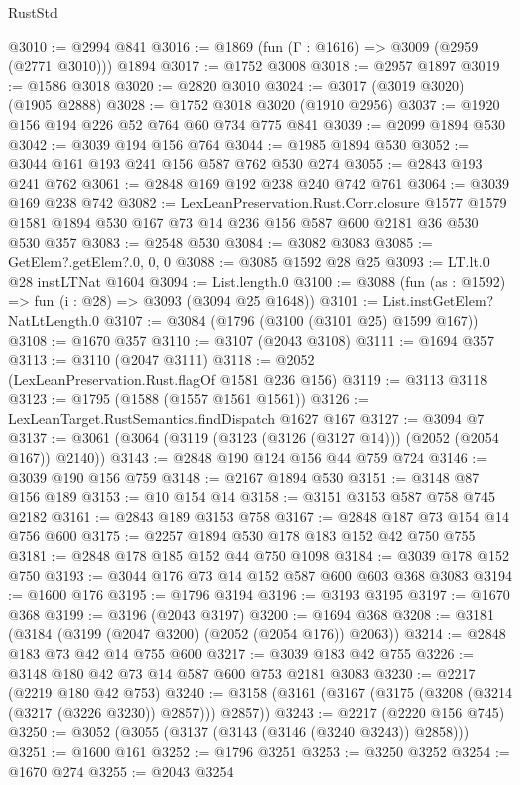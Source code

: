 \begin{lexlean}{RustStd}
\begin{coremodule}
@3010 := @2994 @841
@3016 := @1869 (fun (Γ : @1616) => @3009 (@2959 (@2771 @3010))) @1894
@3017 := @1752 @3008
@3018 := @2957 @1897
@3019 := @1586 @3018
@3020 := @2820 @3010
@3024 := @3017 (@3019 @3020) (@1905 @2888)
@3028 := @1752 @3018 @3020 (@1910 @2956)
@3037 := @1920 @156 @194 @226 @52 @764 @60 @734 @775 @841
@3039 := @2099 @1894 @530
@3042 := @3039 @194 @156 @764
@3044 := @1985 @1894 @530
@3052 := @3044 @161 @193 @241 @156 @587 @762 @530 @274
@3055 := @2843 @193 @241 @762
@3061 := @2848 @169 @192 @238 @240 @742 @761
@3064 := @3039 @169 @238 @742
@3082 := LexLeanPreservation.Rust.Corr.closure
    @1577
    @1579
    @1581
    @1894
    @530
    @167
    @73
    @14
    @236
    @156
    @587
    @600
    @2181
    @36
    @530
    @530
    @357
@3083 := @2548 @530
@3084 := @3082 @3083
@3085 := GetElem?.getElem?.{0, 0, 0}
@3088 := @3085 @1592 @28 @25
@3093 := LT.lt.{0} @28 instLTNat @1604
@3094 := List.length.{0}
@3100 := @3088 (fun (as : @1592) => fun (i : @28) => @3093 (@3094 @25 @1648))
@3101 := List.instGetElem?NatLtLength.{0}
@3107 := @3084 (@1796 (@3100 (@3101 @25) @1599 @167))
@3108 := @1670 @357
@3110 := @3107 (@2043 @3108)
@3111 := @1694 @357
@3113 := @3110 (@2047 @3111)
@3118 := @2052 (LexLeanPreservation.Rust.flagOf @1581 @236 @156)
@3119 := @3113 @3118
@3123 := @1795 (@1588 (@1557 @1561 @1561))
@3126 := LexLeanTarget.RustSemantics.findDispatch @1627 @167
@3127 := @3094 @7
@3137 := @3061 (@3064 (@3119 (@3123 (@3126 (@3127 @14))) (@2052 (@2054 @167)) @2140))
@3143 := @2848 @190 @124 @156 @44 @759 @724
@3146 := @3039 @190 @156 @759
@3148 := @2167 @1894 @530
@3151 := @3148 @87 @156 @189
@3153 := @10 @154 @14
@3158 := @3151 @3153 @587 @758 @745 @2182
@3161 := @2843 @189 @3153 @758
@3167 := @2848 @187 @73 @154 @14 @756 @600
@3175 := @2257 @1894 @530 @178 @183 @152 @42 @750 @755
@3181 := @2848 @178 @185 @152 @44 @750 @1098
@3184 := @3039 @178 @152 @750
@3193 := @3044 @176 @73 @14 @152 @587 @600 @603 @368 @3083
@3194 := @1600 @176
@3195 := @1796 @3194
@3196 := @3193 @3195
@3197 := @1670 @368
@3199 := @3196 (@2043 @3197)
@3200 := @1694 @368
@3208 := @3181 (@3184 (@3199 (@2047 @3200) (@2052 (@2054 @176)) @2063))
@3214 := @2848 @183 @73 @42 @14 @755 @600
@3217 := @3039 @183 @42 @755
@3226 := @3148 @180 @42 @73 @14 @587 @600 @753 @2181 @3083
@3230 := @2217 (@2219 @180 @42 @753)
@3240 := @3158 (@3161 (@3167 (@3175 (@3208 (@3214 (@3217 (@3226 @3230)) @2857))) @2857))
@3243 := @2217 (@2220 @156 @745)
@3250 := @3052 (@3055 (@3137 (@3143 (@3146 (@3240 @3243)) @2858)))
@3251 := @1600 @161
@3252 := @1796 @3251
@3253 := @3250 @3252
@3254 := @1670 @274
@3255 := @2043 @3254

\end{coremodule}
\end{lexlean}
